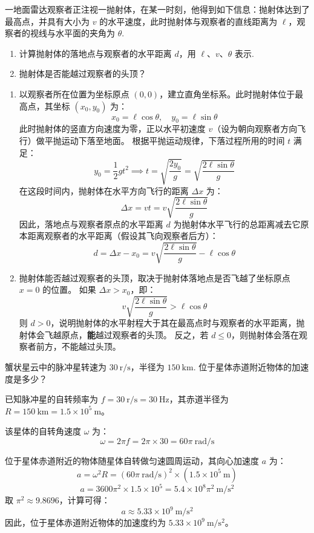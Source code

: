 \begin{exercise}\label{ex:2.5}
一地面雷达观察者正注视一抛射体，在某一时刻，他得到如下信息：抛射体达到了最高点，并具有大小为 $v$ 的水平速度，此时抛射体与观察者的直线距离为 $\ell$，观察者的视线与水平面的夹角为 $\theta$.
\begin{enumerate}
  \item[(a)] 计算抛射体的落地点与观察者的水平距离 $d$，用 $\ell$、$v$、$\theta$ 表示.
  \item[(b)] 抛射体是否能越过观察者的头顶？
\end{enumerate}
\end{exercise}
\begin{solution}
\begin{enumerate}
    \item[(a)] 
    以观察者所在位置为坐标原点 $(0, 0)$，建立直角坐标系。此时抛射体位于最高点，其坐标 $(x_0, y_0)$ 为：
    $$ x_0 = \ell \cos\theta, \quad y_0 = \ell \sin\theta $$
    此时抛射体的竖直方向速度为零，正以水平初速度 $v$（设为朝向观察者方向飞行）做平抛运动下落至地面。
    根据平抛运动规律，下落过程所用的时间 $t$ 满足：
    $$ y_0 = \frac{1}{2}gt^2 \implies t = \sqrt{\frac{2y_0}{g}} = \sqrt{\frac{2\ell \sin\theta}{g}} $$
    在这段时间内，抛射体在水平方向飞行的距离 $\Delta x$ 为：
    $$ \Delta x = v t = v \sqrt{\frac{2\ell \sin\theta}{g}} $$
    因此，落地点与观察者原点的水平距离 $d$ 为抛射体水平飞行的总距离减去它原本距离观察者的水平距离（假设其飞向观察者后方）：
    $$ d = \Delta x - x_0 = v \sqrt{\frac{2\ell \sin\theta}{g}} - \ell \cos\theta $$

    \item[(b)] 
    抛射体能否越过观察者的头顶，取决于抛射体落地点是否飞越了坐标原点 $x = 0$ 的位置。
    如果 $\Delta x > x_0$，即：
    $$ v \sqrt{\frac{2\ell \sin\theta}{g}} > \ell \cos\theta $$
    则 $d > 0$，说明抛射体的水平射程大于其在最高点时与观察者的水平距离，抛射体会飞越原点，\textbf{能}越过观察者的头顶。
    反之，若 $d \le 0$，则抛射体会落在观察者前方，不能越过头顶。
\end{enumerate}
\end{solution}

\begin{exercise}\label{ex:2.6}
蟹状星云中的脉冲星转速为 $30 \ \mathrm{r/s}$，半径为 $150 \ \mathrm{km}$. 位于星体赤道附近物体的加速度是多少？
\end{exercise}
\begin{solution}
已知脉冲星的自转频率为 $f = 30 \ \mathrm{r/s} = 30 \ \mathrm{Hz}$，其赤道半径为 $R = 150 \ \mathrm{km} = 1.5 \times 10^5 \ \mathrm{m}$。

该星体的自转角速度 $\omega$ 为：
$$ \omega = 2\pi f = 2\pi \times 30 = 60\pi \ \mathrm{rad/s} $$

位于星体赤道附近的物体随星体自转做匀速圆周运动，其向心加速度 $a$ 为：
$$ a = \omega^2 R = (60\pi \ \mathrm{rad/s})^2 \times (1.5 \times 10^5 \ \mathrm{m}) $$
$$ a = 3600\pi^2 \times 1.5 \times 10^5 = 5.4 \times 10^8 \pi^2 \ \mathrm{m/s^2} $$
取 $\pi^2 \approx 9.8696$，计算可得：
$$ a \approx 5.33 \times 10^9 \ \mathrm{m/s^2} $$
因此，位于星体赤道附近物体的加速度约为 $5.33 \times 10^9 \ \mathrm{m/s^2}$。
\end{solution}

